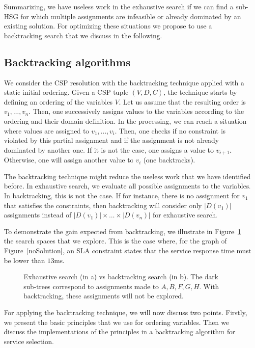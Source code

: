 \documentclass[a4paper]{article}
\begin{document}
Summarizing, we have useless work in the exhaustive search if we can find a sub-HSG for which 
multiple assignments are infeasible or already dominated by an existing solution. 
For optimizing these situations we propose to use a backtracking search that we discuss in the following. 

\subsection{Backtracking algorithms}


We consider the CSP resolution with the backtracking technique applied with a static initial ordering. 
Given a CSP tuple $(V, D, C)$, the technique starts by defining an ordering of the 
variables $V$. Let us assume that the resulting order is $v_1, \dots, v_n$. Then, one successively 
assigns values to the variables according to the ordering and their domain definition. In the processing, 
we can reach a situation where values are assigned to  
$v_1, \dots, v_i$. Then, one checks if no constraint is violated by this partial assignment and if the 
assignment is not already dominated by another one. 
If it is not the case, one assigns a value to $v_{i+1}$. Otherwise, one will assign another 
value to $v_i$ (one backtracks). 

The backtracking technique might reduce the useless work that we have identified before. In 
exhaustive search, we evaluate all possible assignments to the variables. 
In backtracking, this is not the case. If for instance, there is no assignment for $v_1$ that 
satisfies the constraints, then backtracking will consider only $|D(v_1)|$ assignments instead of 
$|D(v_1)|\times \dots \times |D(v_n)|$ for exhaustive search. 

To demonstrate the gain expected from  backtracking, we illustrate in Figure~\ref{backvsExh} the search spaces 
that we explore. This is the case where, for the graph of Figure~\ref{noSolution}, an SLA constraint states that the service response time must be lower than $13$ms. 

\begin{figure}[htbp]
\centering
{}
\caption{Exhaustive search (in a) vs backtracking search (in b). The dark sub-trees correspond to 
assignments made to $A, B, F, G, H$. With backtracking, these assignments will not be explored.}\label{backvsExh}
\end{figure}


For applying the backtracking technique, we will now discuss two points. Firstly, we present 
the basic principles that we use for ordering variables. Then we discuss the implementations 
of the principles in a backtracking algorithm for service selection.
\end{document}
